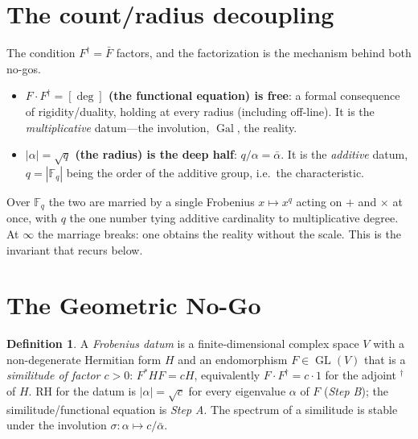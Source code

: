 \documentclass[11pt,reqno]{amsart}
\theoremstyle{plain}
\theoremstyle{definition}
\newtheorem{definition}[theorem]{Definition}
\theoremstyle{remark}
\newcommand{\F}{\mathbb{F}}
\newcommand{\dg}{^{\dagger}}
\newcommand{\Gal}{\operatorname{Gal}}
\DeclareMathOperator{\GL}{GL}
\begin{document}
\section{The count/radius decoupling}\label{sec:decoupling}

The condition $F\dg=\bar F$ factors, and the factorization is the mechanism behind both no-gos.

\begin{itemize}
\item \textbf{$F\cdot F\dg=[\deg]$ (the functional equation) is free}: a formal consequence of
rigidity/duality, holding at every radius (including off-line). It is the \emph{multiplicative} datum---the
involution, $\Gal$, the reality.
\item \textbf{$|\alpha|=\sqrt q$ (the radius) is the deep half}: $q/\alpha=\bar\alpha$. It is the
\emph{additive} datum, $q=|\F_q|$ being the order of the additive group, i.e.\ the characteristic.
\end{itemize}

\noindent Over $\F_q$ the two are married by a single Frobenius $x\mapsto x^q$ acting on $+$ and $\times$ at
once, with $q$ the one number tying additive cardinality to multiplicative degree. At $\infty$ the marriage
breaks: one obtains the reality without the scale. This is the invariant that recurs below.

\section{The Geometric No-Go}\label{sec:B}

\begin{definition}
A \emph{Frobenius datum} is a finite-dimensional complex space $V$ with a non-degenerate Hermitian form
$H$ and an endomorphism $F\in\GL(V)$ that is a \emph{similitude of factor $c>0$}: $F^*HF=cH$, equivalently
$F\cdot F\dg=c\cdot 1$ for the adjoint $\dg$ of $H$. RH for the datum is $|\alpha|=\sqrt c$ for every
eigenvalue $\alpha$ of $F$ (\emph{Step B}); the similitude/functional equation is \emph{Step A}. The spectrum
of a similitude is stable under the involution $\sigma\colon\alpha\mapsto c/\bar\alpha$.
\end{definition}
\end{document}
